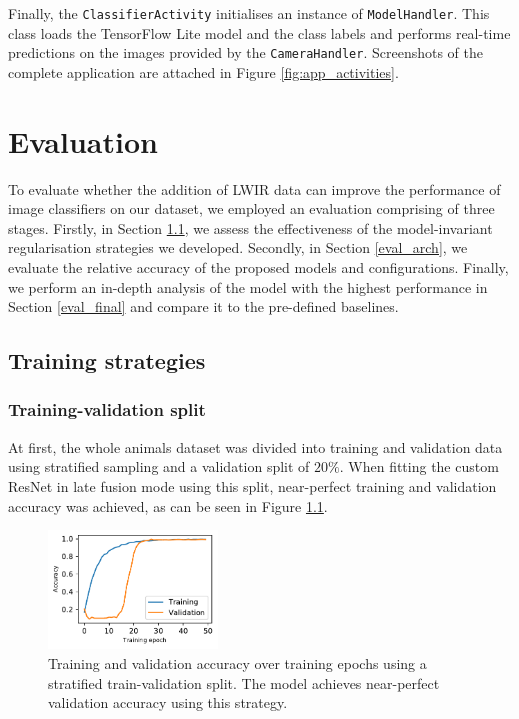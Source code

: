 \documentclass{l4proj}
\begin{document}
Finally, the \lstinline{ClassifierActivity} initialises an instance of \lstinline{ModelHandler}. This class loads the TensorFlow Lite model and the class labels and performs real-time predictions on the images provided by the \lstinline{CameraHandler}. Screenshots of the complete application are attached in Figure \ref{fig:app_activities}.




\chapter{Evaluation}
\label{evaluation}

To evaluate whether the addition of LWIR data can improve the performance of image classifiers on our dataset, we employed an evaluation comprising of three stages. Firstly, in Section \ref{eval_strategies}, we assess the effectiveness of the model-invariant regularisation strategies we developed. Secondly, in Section \ref{eval_arch}, we evaluate the relative accuracy of the proposed models and configurations. Finally, we perform an in-depth analysis of the model with the highest performance in Section \ref{eval_final} and compare it to the pre-defined baselines.

\section{Training strategies}
\label{eval_strategies}

\subsection{Training-validation split}
\label{eval_train_val_split}

At first, the whole animals dataset was divided into training and validation data using stratified sampling and a validation split of $20\%$. When fitting the custom ResNet in late fusion mode using this split, near-perfect training and validation accuracy was achieved, as can be seen in Figure \ref{fig:acc_stratified}.  

\begin{figure}[ht]
  \centering
    \includegraphics[width=0.4\textwidth]{images/evaluation/stratified/accuracy}
  \caption{Training and validation accuracy over training epochs using a stratified train-validation split. The model achieves near-perfect validation accuracy using this strategy.}
  \label{fig:acc_stratified}
\end{figure}
\end{document}
